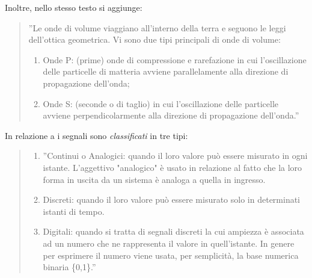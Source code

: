 \documentclass[a4paper]{report} %
\begin{document}
Inoltre, nello stesso testo si aggiunge:
\begin{quote}	
	''Le onde di volume viaggiano all'interno della terra e seguono le leggi dell'ottica geometrica. Vi sono due tipi principali di onde di volume:
	\begin{enumerate}
		\item Onde P: (prime) onde di compressione e rarefazione in cui l'oscillazione delle particelle di matteria avviene parallelamente alla direzione di propagazione dell'onda; 
		\item Onde S: (seconde o di taglio) in cui l'oscillazione delle particelle avviene perpendicolarmente alla direzione di propagazione dell'onda.''
	\end{enumerate}
\end{quote}
In relazione a \cite{art:rif.2} i segnali sono \textit{classificati} in tre tipi:
\begin{quote}
	\begin{enumerate}
		\item ''Continui o Analogici: quando il loro valore può essere misurato in ogni istante. L'aggettivo "analogico" è usato in relazione al fatto che la loro forma in uscita da un sistema è analoga a quella in ingresso.
		\item Discreti: quando il loro valore può essere misurato solo in determinati istanti di tempo.
		\item Digitali: quando si tratta di segnali discreti la cui ampiezza è associata ad un numero che ne rappresenta il valore in quell'istante. In genere per esprimere il numero viene usata, per semplicità, la base numerica binaria \{0,1\}.''
	\end{enumerate}
\end{quote}
\end{document}

